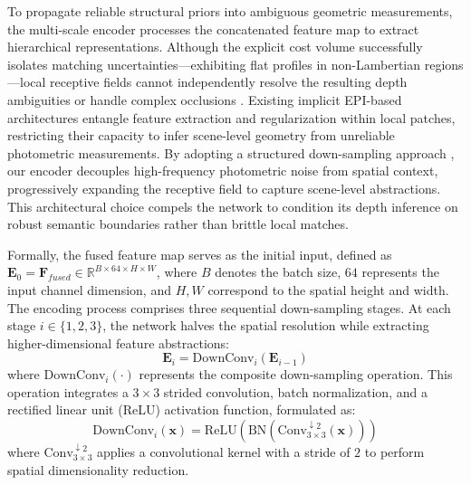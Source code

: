 \documentclass[lettersize,journal]{IEEEtran}
\begin{document}
To propagate reliable structural priors into ambiguous geometric measurements, the multi-scale encoder processes the concatenated feature map to extract hierarchical representations. Although the explicit cost volume successfully isolates matching uncertainties—exhibiting flat profiles in non-Lambertian regions—local receptive fields cannot independently resolve the resulting depth ambiguities or handle complex occlusions \cite{chen2017}. Existing implicit EPI-based architectures \cite{heber2018} entangle feature extraction and regularization within local patches, restricting their capacity to infer scene-level geometry from unreliable photometric measurements. By adopting a structured down-sampling approach \cite{ronneberger2015}, our encoder decouples high-frequency photometric noise from spatial context, progressively expanding the receptive field to capture scene-level abstractions. This architectural choice compels the network to condition its depth inference on robust semantic boundaries rather than brittle local matches.

Formally, the fused feature map serves as the initial input, defined as $\mathbf{E}_0 = \mathbf{F}_{fused} \in \mathbb{R}^{B \times 64 \times H \times W}$, where $B$ denotes the batch size, $64$ represents the input channel dimension, and $H, W$ correspond to the spatial height and width. The encoding process comprises three sequential down-sampling stages. At each stage $i \in \{1, 2, 3\}$, the network halves the spatial resolution while extracting higher-dimensional feature abstractions:
\begin{equation}
\mathbf{E}_i = \text{DownConv}_i(\mathbf{E}_{i-1})
\end{equation}
where $\text{DownConv}_i(\cdot)$ represents the composite down-sampling operation. This operation integrates a $3 \times 3$ strided convolution, batch normalization, and a rectified linear unit (ReLU) activation function, formulated as:
\begin{equation}
\text{DownConv}_i(\mathbf{x}) = \text{ReLU}(\text{BN}(\text{Conv}^{\downarrow 2}_{3 \times 3}(\mathbf{x})))
\end{equation}
where $\text{Conv}^{\downarrow 2}_{3 \times 3}$ applies a convolutional kernel with a stride of $2$ to perform spatial dimensionality reduction.
\end{document}
